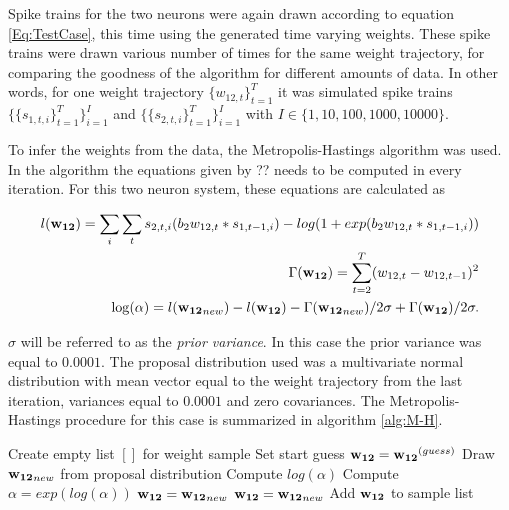 Spike trains for the two neurons were again drawn according to equation \ref{Eq:TestCase}, this time using the generated time varying weights. These spike trains were drawn various number of times for the same weight trajectory, for comparing the goodness of the algorithm for different amounts of data. In other words, for one weight trajectory $\{w_{12,t}\}_{t=1}^T$ it was simulated spike trains
$\{\{s_{1,t,i}\}_{t=1}^T\}_{i=1}^I$ and $\{\{s_{2,t,i}\}_{t=1}^T\}_{i=1}^I$ with $I \in \{1,10,100,1000,10000 \}$.

To infer the weights from the data, the Metropolis-Hastings algorithm was used. In the algorithm the equations given by ?? needs to be computed in every iteration. For this two neuron system, these equations are calculated as

\begin{equation}
\begin{split}
    l({\bf w_{12}}) = \sum_i \sum_t s_{2,t,i}(b_2 w_{12,t}*s_{1,t-1,i}) - log(1 + exp(b_2 w_{12,t} * s_{1,t-1,i})) \\
    \Gamma({\bf w_{12}}) = \sum_{t=2}^T (w_{12,t} - w_ {12,t-1})^2\\
    \log ( \alpha) = l({\bf w_{12}}_{new}) - l({\bf w_{12}}) - \Gamma({\bf w_{12}}_{new})/2\sigma + \Gamma({\bf w_{12}})/2\sigma.
\end{split}
\end{equation}

$\sigma$ will be referred to as the \textit{prior variance}. In this case the  prior variance was equal to $0.0001$. The proposal distribution used was a multivariate normal distribution with mean vector equal to the weight trajectory from the last iteration, variances equal to $0.0001$ and zero covariances. 
The Metropolis-Hastings procedure for this case is summarized in algorithm \ref{alg:M-H}.

\begin{algorithm}
\caption{}\label{alg:M-H}
\begin{algorithmic}
\State Create empty list $[]$ for weight sample
\State Set start guess ${\bf w_{12}} = {\bf w_{12}}^{(guess)}$
\State Draw ${\bf w_{12}}_{new}$ from proposal distribution
\State Compute $log(\alpha)$
\State Compute $\alpha = exp(log(\alpha))$
\State ${\bf w_{12}} = {\bf w_{12}}_{new}$
\Else 
{}
\State ${\bf w_{12}} = {\bf w_{12}}_{new}$
\EndIf
\EndIf
\State Add ${\bf w_{12}}$ to sample list
\EndFor
\end{algorithmic}
\end{algorithm}

